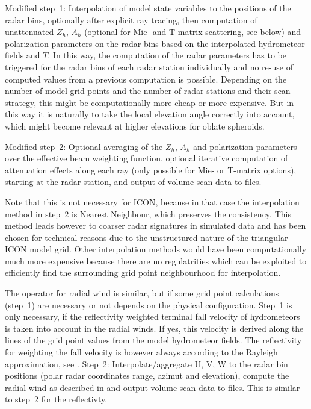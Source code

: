 \documentclass[10pt,a4paper,twoside,headinclude,footinclude,parskip=half]{scrartcl}
\newcommand{\citeP}[1]{\citet{#1}}
\begin{document}
Modified step~1: Interpolation of model state variables to the positions of the radar bins, optionally after explicit ray tracing, then computation of
unattenuated $Z_h$, $A_h$ (optional for Mie- and T-matrix scattering, see below) and polarization parameters
on the radar bins based on the interpolated hydrometeor fields and $T$. In this way, the computation of the radar parameters
has to be triggered for the radar bins of each radar station individually and no re-use of computed values from a previous computation is possible.
Depending on the number of model grid points and the number of radar stations and their scan strategy, this might be computationally more cheap or more expensive.
But in this way it is naturally to take the local elevation angle correctly into account, which might become relevant at higher elevations
for oblate spheroids.

Modified step~2: Optional averaging of the $Z_h$, $A_h$ and polarization parameters over the effective beam weighting function, optional iterative computation
of attenuation effects along each ray (only possible for Mie- or T-matrix options), starting at the radar station, and output of volume
scan data to files.

Note that this is not necessary for ICON, because in that case the interpolation method in step~2 is Nearest Neighbour, which preserves the consistency.
This method leads however to coarser radar signatures in simulated data and has been chosen for technical reasons due to the unstructured nature of the triangular ICON model grid. Other interpolation methods
would have been computationally much more expensive because there are no regulatrities which can be exploited to efficiently find the
surrounding grid point neighbourhood for interpolation.

The operator for radial wind is similar, but if some grid point calculations (step~1) are necessary or not
depends on the physical configuration. Step~1 is only necessary, if the reflectivity weighted terminal fall velocity
of hydrometeors is taken into account in the radial winds. If yes, this velocity is derived along the
lines of the grid point values from the model hydrometeor fields. The reflectivity for weighting the 
fall velocity is however always according to the Rayleigh approximation, see \citeP{zeng2016a}.
Step~2: Interpolate/aggregate U, V, W to the radar bin positions (polar radar coordinates
range, azimut and elevation), compute the radial wind as described in \citeP{zeng2016a} and
output volume scan data to files. This is similar to step~2 for the reflectivty.
\end{document}
